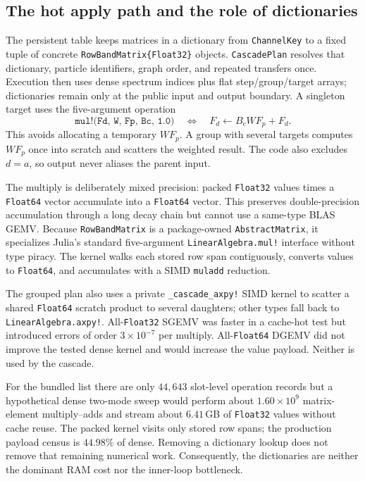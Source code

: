 \documentclass[11pt]{article}
\begin{document}
\subsection{The hot apply path and the role of dictionaries}

The persistent table keeps matrices in a dictionary from \texttt{ChannelKey}
to a fixed tuple of concrete \texttt{RowBandMatrix\{Float32\}} objects.
\texttt{CascadePlan} resolves that dictionary, particle identifiers, graph
order, and repeated transfers once.  Execution then uses dense spectrum
indices plus flat step/group/target arrays; dictionaries remain only at the
public input and output boundary.  A singleton target uses the five-argument
operation
\begin{equation}
\texttt{mul!(Fd, W, Fp, Bc, 1.0)}
\quad\Longleftrightarrow\quad
F_d\leftarrow B_cWF_p+F_d .
\end{equation}
This avoids allocating a temporary $WF_p$.  A group with several targets
computes $WF_p$ once into scratch and scatters the weighted result.  The code
also excludes $d=a$, so output never aliases the parent input.

The multiply is deliberately mixed precision: packed \texttt{Float32} values
times a \texttt{Float64} vector accumulate into a \texttt{Float64} vector.
This preserves double-precision accumulation through a long decay chain but
cannot use a same-type BLAS GEMV.  Because \texttt{RowBandMatrix} is a
package-owned \texttt{AbstractMatrix}, it specializes Julia's standard
five-argument \texttt{LinearAlgebra.mul!} interface without type piracy.  The
kernel walks each stored row span contiguously, converts values to
\texttt{Float64}, and accumulates with a SIMD \texttt{muladd} reduction.

The grouped plan also uses a private \texttt{\_cascade\_axpy!} SIMD kernel to
scatter a shared \texttt{Float64} scratch product to several daughters;
other types fall back to \texttt{LinearAlgebra.axpy!}.  All-\texttt{Float32}
SGEMV was faster in a cache-hot test but
introduced errors of order $3\times10^{-7}$ per multiply.  All-\texttt{Float64}
DGEMV did not improve the tested dense kernel and would increase the value
payload.  Neither is used by the cascade.

For the bundled list there are only $44{,}643$ slot-level operation records
but a hypothetical dense two-mode sweep would perform about
$1.60\times10^9$ matrix-element multiply--adds and stream about $6.41$\,GB of
\texttt{Float32} values without cache reuse.  The packed kernel visits only
stored row spans; the production payload census is $44.98\%$ of dense.
Removing a dictionary lookup does not remove that remaining numerical work.
Consequently, the dictionaries are neither the dominant RAM cost nor the
inner-loop bottleneck.
\end{document}

